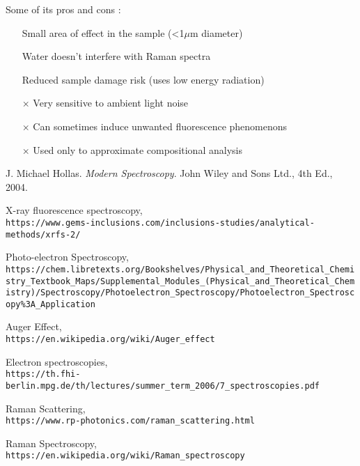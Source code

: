 \documentclass[]{article}
\begin{document}
Some of its pros and cons \cite{RM_Wiki}:
\begin{itemize}
\item[\checkmark] Small area of effect in the sample (<1$\mu$m diameter)
\item[\checkmark] Water doesn't interfere with Raman spectra
\item[\checkmark] Reduced sample damage risk (uses low energy radiation)
\item[$\times$] Very sensitive to ambient light noise
\item[$\times$] Can sometimes induce unwanted fluorescence phenomenons
\item[$\times$] Used only to approximate compositional analysis
\end{itemize}

\newpage

\begin{thebibliography}{9}
J. Michael Hollas. 
\textit{Modern Spectroscopy}. 
John Wiley and Sons Ltd., 4th Ed., 2004.

X-ray fluorescence spectroscopy,
\\\texttt{https://www.gems-inclusions.com/inclusions-studies/analytical-methods/xrfs-2/}

Photo-electron Spectroscopy,
\\\texttt{https://chem.libretexts.org/Bookshelves/Physical\_and\_Theoretical\_Chemistry\_Textbook\_Maps/Supplemental\_Modules\_(Physical\_and\_Theoretical\_Chemistry)/Spectroscopy/Photoelectron\_Spectroscopy/Photoelectron\_Spectroscopy\%3A\_Application}

Auger Effect,
\\\texttt{https://en.wikipedia.org/wiki/Auger\_effect}

Electron spectroscopies,
\\\texttt{https://th.fhi-berlin.mpg.de/th/lectures/summer\_term\_2006/7\_spectroscopies.pdf}

Raman Scattering,
\\\texttt{https://www.rp-photonics.com/raman\_scattering.html}

Raman Spectroscopy,
\\\texttt{https://en.wikipedia.org/wiki/Raman\_spectroscopy}

\end{thebibliography}
\end{document}
